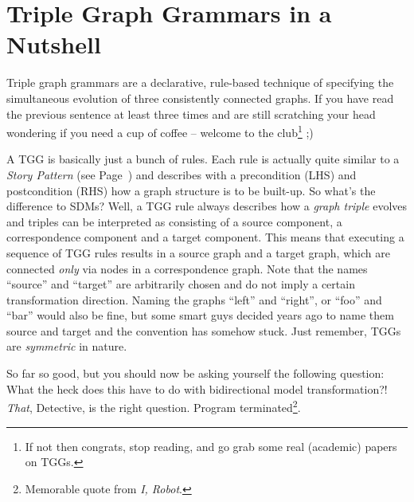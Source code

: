 \section{Triple Graph Grammars in a Nutshell}

Triple graph grammars are a declarative, rule-based technique of specifying the simultaneous evolution of three consistently connected graphs.
If you have read the previous sentence at least three times and are still scratching your head wondering if you need a cup of coffee -- welcome to the club\footnote{If not then congrats, stop reading, and go grab some real (academic) papers on TGGs.} ;)

A TGG is basically just a bunch of rules.
Each rule is actually quite similar to a \emph{Story Pattern} (see Page~\pageref{story-pattern}) and describes with a precondition (LHS) and postcondition (RHS) how a graph structure is to be built-up.
So what's the difference to SDMs?  
Well, a TGG rule always describes how a \emph{graph triple} evolves and triples can be interpreted as consisting of a source component, a correspondence component and a target component.
This means that executing a sequence of TGG rules results in a source graph and a target graph, which are connected \emph{only} via nodes in a correspondence graph.
Note that the names ``source'' and ``target'' are arbitrarily chosen and do not imply a certain transformation direction.
Naming the graphs ``left'' and ``right'', or ``foo'' and ``bar'' would also be fine, but some smart guys decided years ago to name them source and target and the convention has somehow stuck.
Just remember, TGGs are \emph{symmetric} in nature. 

So far so good, but you should now be asking yourself the following question: What the {\huge heck} does this have to do with bidirectional model transformation?!  \emph{That}, Detective, is the right question. Program terminated\footnote{Memorable quote from \emph{I, Robot}.}.

